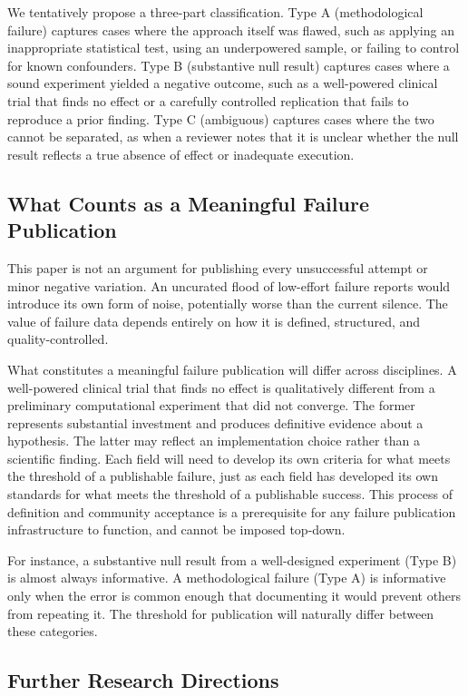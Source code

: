We tentatively propose a three-part classification. Type A
(methodological failure) captures cases where the approach itself
was flawed, such as applying an inappropriate statistical test,
using an underpowered sample, or failing to control for known
confounders. Type B (substantive null result) captures cases where
a sound experiment yielded a negative outcome, such as a
well-powered clinical trial that finds no effect or a carefully
controlled replication that fails to reproduce a prior finding.
Type C (ambiguous) captures cases where the two cannot be
separated, as when a reviewer notes that it is unclear whether the
null result reflects a true absence of effect or inadequate
execution.

\subsection{What Counts as a Meaningful Failure Publication}

This paper is not an argument for publishing every unsuccessful
attempt or minor negative variation. An uncurated flood of
low-effort failure reports would introduce its own form of noise,
potentially worse than the current silence. The value of failure
data depends entirely on how it is defined, structured, and
quality-controlled.

What constitutes a meaningful failure publication will differ across
disciplines. A well-powered clinical trial that finds no effect is
qualitatively different from a preliminary computational experiment
that did not converge. The former represents substantial investment
and produces definitive evidence about a hypothesis. The latter may
reflect an implementation choice rather than a scientific finding.
Each field will need to develop its own criteria for what meets the
threshold of a publishable failure, just as each field has developed
its own standards for what meets the threshold of a publishable
success. This process of definition and community acceptance is a
prerequisite for any failure publication infrastructure to function,
and cannot be imposed top-down.

For instance, a substantive null result from a well-designed
experiment (Type B) is almost always informative. A methodological
failure (Type A) is informative only when the error is common
enough that documenting it would prevent others from repeating it.
The threshold for publication will naturally differ between these
categories.

\subsection{Further Research Directions}

